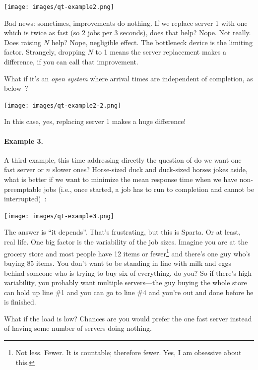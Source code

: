\documentclass[a4paper]{report}
\begin{document}
\begin{center}
	\texttt{[image: images/qt-example2.png]}
\end{center}

Bad news: sometimes, improvements do nothing. If we replace server 1 with one which is twice as fast (so 2 jobs per 3 seconds), does that help? Nope. Not really. Does raising $N$ help? Nope, negligible effect. The bottleneck device is the limiting factor. Strangely, dropping $N$ to 1 means the server replacement makes a difference, if you can call that improvement. 

What if it's an \textit{open system} where arrival times are independent of completion, as below~\cite{pmd}?


\begin{center}
	\texttt{[image: images/qt-example2-2.png]}
\end{center}

In this case, yes, replacing server 1 makes a huge difference!

\paragraph{Example 3.} A third example, this time addressing directly the question of do we want one fast server or $n$ slower ones? Horse-sized duck and duck-sized horses jokes aside, what is better if we want to minimize the mean response time when we have non-preemptable jobs (i.e., once started, a job has to run to completion and cannot be interrupted)~\cite{pmd}:


\begin{center}
	\texttt{[image: images/qt-example3.png]}
\end{center}

The answer is ``it depends''. That's frustrating, but this is Sparta. Or at least, real life. One big factor is the variability of the job sizes. Imagine you are at the grocery store and most people have 12 items or fewer\footnote{Not less. Fewer. It is countable; therefore fewer. Yes, I am obsessive about this.} and there's one guy who's buying 85 items. You don't want to be standing in line with milk and eggs behind someone who is trying to buy six of everything, do you? So if there's high variability, you probably want multiple servers---the guy buying the whole store can hold up line \#1 and you can go to line \#4 and you're out and done before he is finished.

What if the load is low? Chances are you would prefer the one fast server instead of having some number of servers doing nothing.
\end{document}
